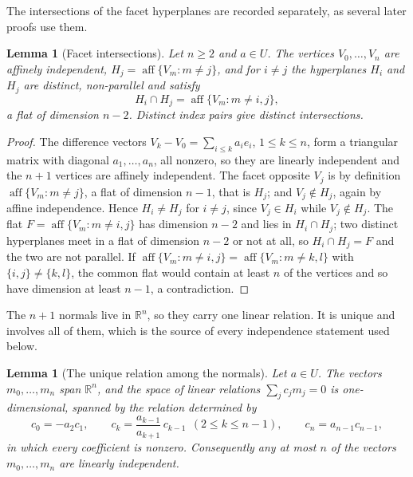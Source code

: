 \documentclass[11pt,a4paper]{article}
\newcommand{\R}{\mathbb{R}}
\newtheorem{lemma}[theorem]{Lemma}
\theoremstyle{definition}
\theoremstyle{remark}
\theoremstyle{plain}
\begin{document}
The intersections of the facet hyperplanes are recorded separately, as several later proofs
use them.

\begin{lemma}[Facet intersections]\label{lem:facet-int}
Let $n\ge2$ and $a\in U$. The vertices $V_0,\dots,V_n$ are affinely independent,
$H_j=\operatorname{aff}\{V_m:m\ne j\}$, and for $i\ne j$ the hyperplanes $H_i$ and $H_j$ are
distinct, non-parallel and satisfy
\[
H_i\cap H_j=\operatorname{aff}\{V_m:m\ne i,j\},
\]
a flat of dimension $n-2$. Distinct index pairs give distinct intersections.
\end{lemma}

\begin{proof}
The difference vectors $V_k-V_0=\sum_{i\le k}a_ie_i$, $1\le k\le n$, form a triangular matrix
with diagonal $a_1,\dots,a_n$, all nonzero, so they are linearly independent and the $n+1$
vertices are affinely independent. The facet opposite $V_j$ is by definition
$\operatorname{aff}\{V_m:m\ne j\}$, a flat of dimension $n-1$, that is $H_j$; and $V_j\notin
H_j$, again by affine independence. Hence $H_i\ne H_j$ for $i\ne j$, since $V_j\in H_i$ while
$V_j\notin H_j$. The flat $F=\operatorname{aff}\{V_m:m\ne i,j\}$ has dimension $n-2$ and lies
in $H_i\cap H_j$; two distinct hyperplanes meet in a flat of dimension $n-2$ or not at all, so
$H_i\cap H_j=F$ and the two are not parallel. If $\operatorname{aff}\{V_m:m\ne i,j\}=
\operatorname{aff}\{V_m:m\ne k,l\}$ with $\{i,j\}\ne\{k,l\}$, the common flat would contain at
least $n$ of the vertices and so have dimension at least $n-1$, a contradiction.
\end{proof}

The $n+1$ normals live in $\R^n$, so they carry one linear relation. It is unique and involves
all of them, which is the source of every independence statement used below.

\begin{lemma}[The unique relation among the normals]\label{lem:independence}
Let $a\in U$. The vectors $m_0,\dots,m_n$ span $\R^n$, and the space of linear relations
$\sum_jc_jm_j=0$ is one-dimensional, spanned by the relation determined by
\[
c_0=-a_2c_1,\qquad c_k=\frac{a_{k-1}}{a_{k+1}}\,c_{k-1}\ \ (2\le k\le n-1),\qquad
c_n=a_{n-1}c_{n-1},
\]
in which every coefficient is nonzero. Consequently any at most $n$ of the vectors
$m_0,\dots,m_n$ are linearly independent.
\end{lemma}
\end{document}
